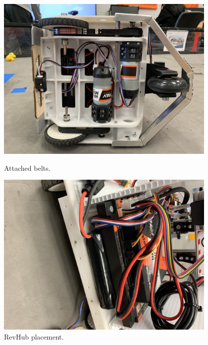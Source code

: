 \begin{figure}[ht]
\centering
\begin{minipage}[b]{.48\textwidth}
  \centering
  \includegraphics[width=0.95\textwidth]{Meetings/October/10-29-21/10-29-21_Hardware_Figure1 - Nathan Forrer.JPG}
  \caption{Attached belts.}
  \label{fig:102921_7}
\end{minipage}%
\hfill%
\begin{minipage}[b]{.48\textwidth}
  \centering
  \includegraphics[width=0.95\textwidth]{Meetings/October/10-29-21/10-29-21_Hardware_Figure2 - Nathan Forrer.JPG}
  \caption{RevHub placement.}
  \label{fig:102921_4}
\end{minipage}
\end{figure}

